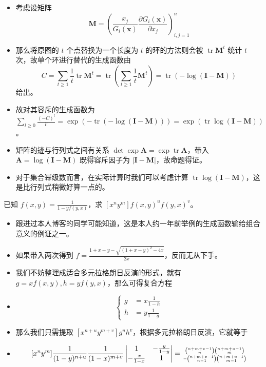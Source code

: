 \documentclass[mathserif]{ctexbeamer}
\begin{document}
\frame
{
  \begin{itemize}
  \item<1->考虑设矩阵
$$
\mathbf M = \left(\frac{x_j}{G_i(\mathbf x)} \frac{\partial G_i (\mathbf x)}{\partial x_j}\right)_{i,j=1}^n
$$
  \item<2->那么将原图的 $t$ 个点替换为一个长度为 $t$ 的环的方法则会被 $\operatorname{tr} \mathbf M^t$ 统计 $t$ 次，故单个环进行替代的生成函数由
$$
C = \sum_{t\ge 1} \frac 1t\operatorname{tr} \mathbf M^t = \operatorname{tr}\left(\sum_{t\ge 1} \frac 1t\mathbf M^t\right) = \operatorname{tr} \left(-\log (\mathbf{I-M})\right)
$$
给出。
  \end{itemize}
}

\frame
{
  \begin{itemize}
  \item<1->故对其容斥的生成函数为 $\sum_{l\ge 0} \frac{(-C)^l}{l!}=\exp \left(-\operatorname{tr} \left(-\log (\mathbf{I-M})\right)\right) = \exp \left(\operatorname{tr} \log (\mathbf{I-M})\right)$。
  \item<2->矩阵的迹与行列式之间有关系 $\det \exp \mathbf A = \exp \operatorname{tr} \mathbf A$，带入 $\mathbf A = \log (\mathbf{I-M})$ 既得容斥因子为 $|\mathbf{I-M}|$，故命题得证。
  \item<3->对于集合幂级数而言，在实际计算时我们可以考虑计算 $\operatorname{tr} \log (\mathbf{I-M})$，这是比行列式稍微好算一点的。
  \end{itemize}
}

\frame
{
  \begin{example}
  已知 $f(x, y)=\frac1{1-yf(y,x)}$，求 $[x^ny^m]f(x,y)^uf(y,x)^v$。
  \end{example}
  
  \begin{itemize}
  \item<1-> 跟进过本人博客的同学可能知道，这是本人约一年前举例的生成函数输给组合意义的例证之一。
  \item<2-> 如果带入两次得到 $f=\frac{1+x-y - \sqrt{(1+x-y)^2 - 4x}}{2x}$，反而无从下手。
  \end{itemize}
}

\frame
{
  \begin{itemize}
  \item<1-> 我们不妨整理成适合多元拉格朗日反演的形式，就有 $g=xf(x,y),h=yf(y,x)$，那么可得复合方程
  \item<2-> $$\begin{cases}
g &= x \frac1{1-h}\\
h &= y \frac1{1-g}
\end{cases}$$
  \item<3-> 那么我们只需提取 $[x^{n+u}y^{m+v}]g^uh^v$，根据多元拉格朗日反演，它就等于
  \item<4-> $$
[x^ny^m]\frac1{(1-y)^{n+u}}\frac 1{(1-x)^{m+v}}\left|
\begin{matrix}
1 & -\frac y{1-y}\\
-\frac x{1-x} & 1
\end{matrix}  
\right| = {\scriptscriptstyle{\binom{n+m+v-1}n\binom{n+m+u-1}m \atop - \binom{n+m+v-1}{n-1}\binom{n+m+u-1}{m-1}}}
  $$
  \end{itemize}
}
\end{document}
